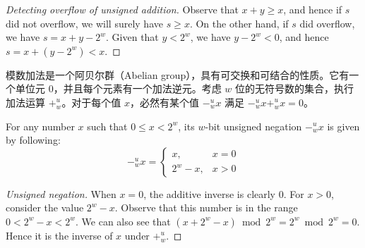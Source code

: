 \begin{proof}[Detecting overflow of unsigned addition]
    Observe that $x + y \geq x$, and hence if $s$ did not overflow, we will surely have $s \geq x$. On the other hand, if $s$ did overflow, we have $s = x + y - 2^w$. Given that $y < 2^w$, we have $y - 2^w < 0$, and hence $s = x + (y - 2^w) < x$.
\end{proof}

模数加法是一个阿贝尔群（Abelian group），具有可交换和可结合的性质。它有一个单位元 $0$，并且每个元素有一个加法逆元。考虑 $w$ 位的无符号数的集合，执行加法运算 $+^u_w$。对于每个值 $x$，必然有某个值 $-^u_wx$ 满足 $-^u_wx +^u_wx = 0$。

\begin{theorem}
    For any number $x$ such that $0 \leq x < 2^w$, its $w$-bit unsigned negation $-^u_wx$ is given by following:
    \begin{equation}
        -^u_wx = \left\{
        \begin{array}{ll}
            x, & x = 0 \\
            2^w - x, & x > 0
        \end{array}
        \right.
        \label{thm:negu}
    \end{equation}
\end{theorem}

\begin{proof}[Unsigned negation]
    When $x = 0$, the additive inverse is clearly $0$. For $x > 0$, consider the value $2^w - x$. Observe that this number is in the range $ 0 < 2^w - x < 2^w$. We can also see that $(x + 2^w -x ) \bmod 2^w = 2^w \bmod 2^w = 0$. Hence it is the inverse of $x$ under $+^u_w$.
\end{proof}
\endinput
